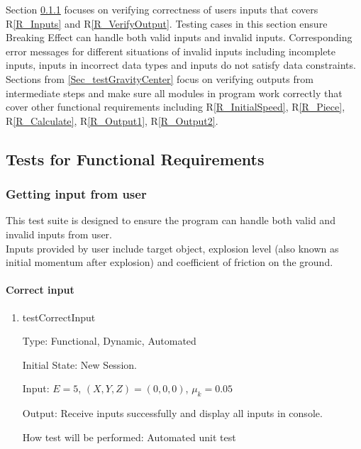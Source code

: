 \documentclass[12pt, titlepage]{article}
\newcommand{\rref}[1]{R\ref{#1}}
\begin{document}
Section \ref{Sec_TestInput} focuses on verifying correctness of users inputs that covers \rref{R_Inputs} and \rref{R_VerifyOutput}. Testing cases in this section ensure Breaking Effect can handle both valid inputs and invalid inputs. Corresponding error messages for different situations of invalid inputs including incomplete inputs, inputs in incorrect data types and inputs do not satisfy data constraints.\\  
Sections from \ref{Sec_testGravityCenter} focus on verifying outputs from intermediate steps and make sure all modules in program work correctly that cover other functional requirements including \rref{R_InitialSpeed}, \rref{R_Piece}, \rref{R_Calculate}, \rref{R_Output1}, \rref{R_Output2}. 

\subsection{Tests for Functional Requirements}

\subsubsection{Getting input from user}
\label{Sec_TestInput}

This test suite is designed to ensure the program can handle both valid and invalid inputs from user.\\ 
Inputs provided by user include target object, explosion level (also known as initial momentum after explosion) and coefficient of friction on the ground. 
		
\paragraph{Correct input}

\begin{enumerate}

\item{testCorrectInput\\}

Type: Functional, Dynamic, Automated

Initial State: New Session.

Input: $E = 5$, $(X,Y,Z) = (0,0,0)$, $\mu_{k} = 0.05$  

Output: Receive inputs successfully and display all inputs in console.

How test will be performed: Automated unit test 

\end{enumerate}
\end{document}
